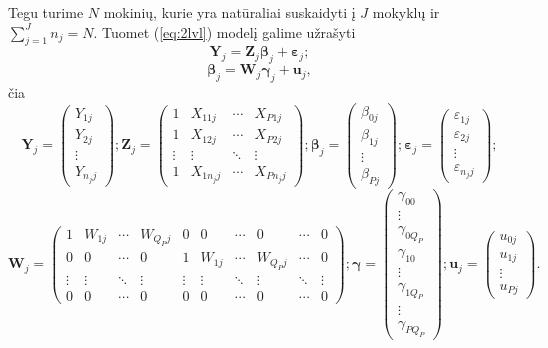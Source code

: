 \documentclass[12pt,a4paper]{article}
\begin{document}
Tegu turime $N$ mokinių, kurie yra natūraliai suskaidyti į $J$ mokyklų ir $\sum^J_{j=1} n_j = N$. Tuomet (\ref{eq:2lvl}) modelį galime užrašyti
\begin{equation}
\mathbf{Y}_j=\mathbf{Z}_j\boldsymbol{\beta}_j+\boldsymbol{\varepsilon}_j;
\end{equation}
\begin{equation}
\boldsymbol{\beta}_{j}=\mathbf{W}_{j}\boldsymbol{\gamma}_{j}+\mathbf{u}_{j},
\end{equation}
čia
\[
\mathbf{Y}_{j} =
\begin{pmatrix}
Y_{1j} \\
Y_{2j} \\
\vdots \\
Y_{n_jj}
\end{pmatrix};
\mathbf{Z}_{j} =
\begin{pmatrix}
1 & X_{11j} & \cdots & X_{P1j} \\
1 & X_{12j} & \cdots & X_{P2j} \\
\vdots & \vdots & \ddots & \vdots \\
1 & X_{1n_jj} & \cdots & X_{Pn_jj}
\end{pmatrix};
\boldsymbol{\beta}_{j} =
\begin{pmatrix}
\beta_{0j} \\
\beta_{1j} \\
\vdots \\
\beta_{Pj}
\end{pmatrix};
\boldsymbol{\varepsilon}_{j} =
\begin{pmatrix}
\varepsilon_{1j} \\
\varepsilon_{2j} \\
\vdots \\
\varepsilon_{n_jj}
\end{pmatrix};
\]
\[
\mathbf{W}_{j} =
\begin{pmatrix}
1& W_{1j} & \cdots & W_{Q_Pj} & 0 & 0 & \cdots & 0 & \cdots & 0\\
0 &0 & \cdots & 0 &1 & W_{1j} & \cdots & W_{Q_Pj} & \cdots &0\\
\vdots & \vdots & \ddots & \vdots & \vdots & \vdots & \ddots & \vdots & \ddots & \vdots\\
0 &0 & \cdots & 0 & 0& 0&\cdots & 0& \cdots & 0
\end{pmatrix};
\boldsymbol{\gamma}=
\begin{pmatrix}
\gamma_{00} \\
\vdots\\
\gamma_{0Q_P} \\
\gamma_{10}\\
\vdots\\
\gamma_{1Q_P} \\
\vdots \\
\gamma_{PQ_P}
\end{pmatrix};
\mathbf{u}_{j} =
\begin{pmatrix}
u_{0j} \\
u_{1j} \\
\vdots \\
u_{Pj}
\end{pmatrix}.
\]
\end{document}
